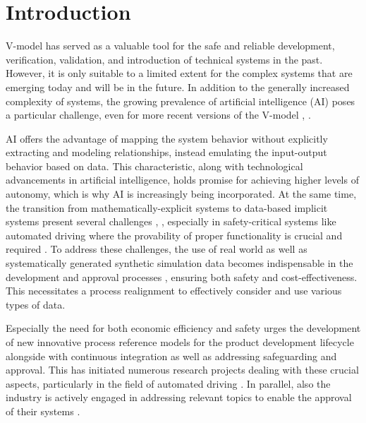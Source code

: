 \section{Introduction}\label{01_Introduction}
 V-model \cite{brohl1993v} has served as a valuable tool for the safe and reliable development, verification, validation, and introduction of technical systems in the past. However, it is only suitable to a limited extent for the complex systems that are emerging today and will be in the future. In addition to the generally increased complexity of systems, the growing prevalence of artificial intelligence (AI) poses a particular challenge, even for more recent versions of the V-model \cite{graessler2018v}, \cite{GraesslerHentze}.

AI offers the advantage of mapping the system behavior without explicitly extracting and modeling relationships, instead emulating the input-output behavior based on data. This characteristic, along with technological advancements in artificial intelligence, holds promise for achieving higher levels of autonomy, which is why AI is increasingly being incorporated. At the same time, the transition from mathematically-explicit systems to data-based implicit systems present several challenges \cite{amodei2016concrete}, \cite{neto2022safety}, especially in safety-critical systems \cite{kurd2007developing, forsberg2020challenges} like automated driving where the provability of proper functionality is crucial and required \cite{europeancommissionaiact}. To address these challenges, the use of real world as well as systematically generated synthetic simulation data becomes indispensable in the development \cite{KIDeltaSynData} and approval processes \cite{KIAbsicherungSynData}, ensuring both safety and cost-effectiveness. This necessitates a process realignment to effectively consider and use various types of data.

Especially the need for both economic efficiency and safety urges the development of new innovative process reference models for the product development lifecycle alongside with continuous integration as well as addressing safeguarding and approval. This has initiated numerous research projects dealing with these crucial aspects, particularly in the field of automated driving \cite{PATH, SAKURA, V4SAFETY, PEGASUS, HIDrive, KIFamilie, LOPAAS, VIVID, SUNRISE}. In parallel, also the industry is actively engaged in addressing relevant topics to enable the approval of their systems \cite{karpathy_cvpr21, favaro2023building}. 

